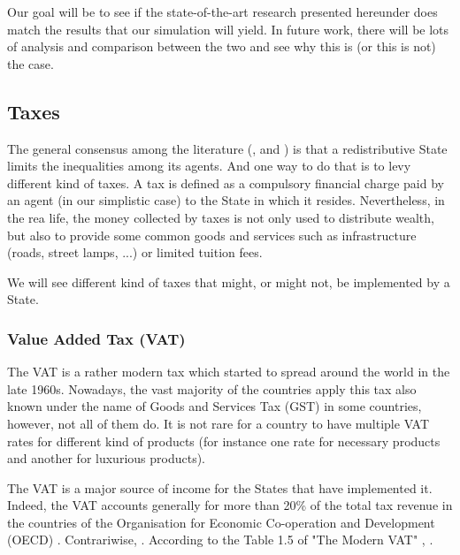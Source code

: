 \documentclass[12pt]{article}
\begin{document}
Our goal will be to see if the state-of-the-art research presented hereunder does match the results that our simulation will yield. In future work, there will be lots of analysis and comparison between the two and see why this is (or this is not) the case.

\subsection{Taxes}

    The general consensus among the literature (\cite{burman2012taxes}, \cite{leigh2008redistributive} and \cite{taxes_inequalities}) is that a redistributive State limits the inequalities among its agents. And one way to do that is to levy different kind of taxes. A tax is defined as a compulsory financial charge paid by an agent (in our simplistic case) to the State in which it resides. 
    Nevertheless, in the rea life, the money collected by taxes is not only used to distribute wealth, but also to provide some common goods and services such as infrastructure (roads, street lamps, ...) or limited tuition fees.
    
    We will see different kind of taxes that might, or might not, be implemented by a State.

    \subsubsection{Value Added Tax (VAT)}
    
    The VAT is a rather modern tax which started to spread around the world in the late 1960s. Nowadays, the vast majority of the countries apply this tax also known under the name of Goods and Services Tax (GST) in some countries, however, not all of them do. It is not rare for a country to have multiple VAT rates for different kind of products (for instance one rate for necessary products and another for luxurious products).
    
    The VAT is a major source of income for the States that have implemented it. Indeed, the VAT accounts generally for more than 20\% of the total tax revenue in the countries of the Organisation for Economic Co-operation and Development (OECD) \cite{TheModernVAT}. Contrariwise,  \cite{OriginOfVAT}. According to the Table 1.5 of "The Modern VAT" \cite{TheModernVAT}, . 
    
\end{document}

